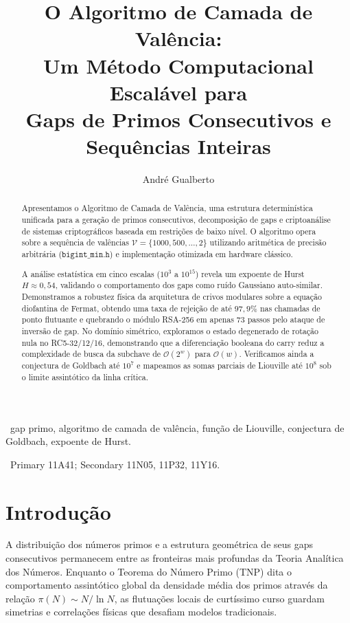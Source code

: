 \documentclass[12pt,a4paper]{article}
\title{O Algoritmo de Camada de Valência:\\Um Método Computacional Escalável para\\Gaps de Primos Consecutivos e Sequências Inteiras}
\author{Andr\'e Gualberto}
\theoremstyle{plain}
\begin{document}
\maketitle

\begin{abstract}
Apresentamos o Algoritmo de Camada de Valência, uma estrutura determinística
unificada para a geração de primos consecutivos, decomposição de gaps e
criptoanálise de sistemas criptográficos baseada em restrições de baixo
nível.  O algoritmo opera sobre a sequência de valências
$\mathcal{V} = \{1000, 500, \dots, 2\}$ utilizando aritmética de
precisão arbitrária ($\mathtt{bigint\_min.h}$) e implementação otimizada
em hardware clássico.

A análise estatística em cinco escalas ($10^3$ a $10^{15}$) revela um
expoente de Hurst $H \approx 0{,}54$, validando o comportamento dos gaps
como ruído Gaussiano auto-similar.  Demonstramos a robustez física da
arquitetura de crivos modulares sobre a equação diofantina de Fermat,
obtendo uma taxa de rejeição de até $97{,}9\%$ nas chamadas de ponto
flutuante e quebrando o módulo RSA-256 em apenas 73 passos pelo ataque
de inversão de gap.  No domínio simétrico, exploramos o estado
degenerado de rotação nula no RC5-32/12/16, demonstrando que a
diferenciação booleana do carry reduz a complexidade de busca da
subchave de $\mathcal{O}(2^w)$ para $\mathcal{O}(w)$.
Verificamos ainda a conjectura de Goldbach até $10^7$ e mapeamos as
somas parciais de Liouville até $10^8$ sob o limite assintótico da
linha crítica.
\end{abstract}

\ gap primo, algoritmo de camada de valência,
função de Liouville, conjectura de Goldbach, expoente de Hurst.

\ Primary 11A41;
Secondary 11N05, 11P32, 11Y16.

\section{Introdução}
\label{sec:intro}

A distribuição dos números primos e a estrutura geométrica de seus gaps
consecutivos permanecem entre as fronteiras mais profundas da Teoria
Analítica dos Números.  Enquanto o Teorema do Número Primo (TNP) dita
o comportamento assintótico global da densidade média dos primos através
da relação $\pi(N) \sim N / \ln N$, as flutuações locais de curtíssimo
curso guardam simetrias e correlações físicas que desafiam modelos
tradicionais.
\end{document}
